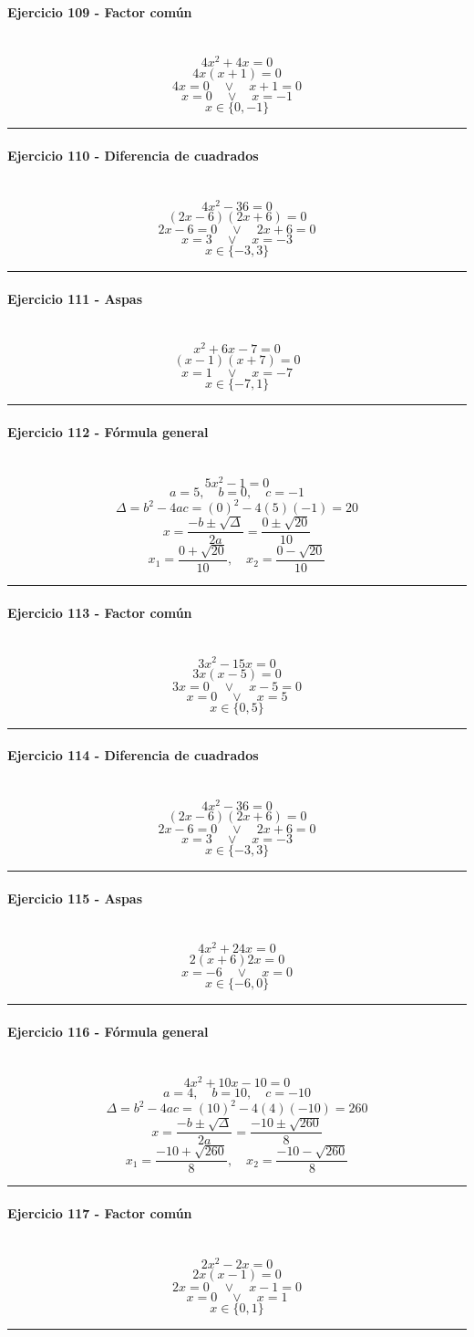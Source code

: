 \documentclass[10pt,a4paper]{article}
\newcommand{\res}[1]{\paragraph{#1}\mbox{}\\[-1.2em]}
\begin{document}
\res{Ejercicio 109 - Factor común}
\[ 4 x^{2} + 4 x=0 \]
\[ 4x(x+1)=0 \]
\[ 4x=0 \quad \vee \quad x+1=0 \]
\[ x=0 \quad \vee \quad x=-1 \]
\[ \boxed{x\in\{0,-1\}} \]
\vspace{1mm}\hrule\vspace{2mm}
\res{Ejercicio 110 - Diferencia de cuadrados}
\[ 4 x^{2} - 36=0 \]
\[ (2x-6)(2x+6)=0 \]
\[ 2x-6=0 \quad \vee \quad 2x+6=0 \]
\[ x=3 \quad \vee \quad x=-3 \]
\[ \boxed{x\in\{-3,3\}} \]
\vspace{1mm}\hrule\vspace{2mm}
\res{Ejercicio 111 - Aspas}
\[ x^{2} + 6 x - 7=0 \]
\[ (x-1)(x+7)=0 \]
\[ x=1 \quad \vee \quad x=-7 \]
\[ \boxed{x\in\{-7,1\}} \]
\vspace{1mm}\hrule\vspace{2mm}
\res{Ejercicio 112 - Fórmula general}
\[ 5 x^{2} - 1=0 \]
\[ a=5,\quad b=0,\quad c=-1 \]
\[ \Delta=b^2-4ac=(0)^2-4(5)(-1)=20 \]
\[ x=\frac{-b\pm\sqrt{\Delta}}{2a}=\frac{0\pm\sqrt{20}}{10} \]
\[ \boxed{x_1=\frac{0+\sqrt{20}}{10},\quad x_2=\frac{0-\sqrt{20}}{10}} \]
\vspace{1mm}\hrule\vspace{2mm}
\res{Ejercicio 113 - Factor común}
\[ 3 x^{2} - 15 x=0 \]
\[ 3x(x-5)=0 \]
\[ 3x=0 \quad \vee \quad x-5=0 \]
\[ x=0 \quad \vee \quad x=5 \]
\[ \boxed{x\in\{0,5\}} \]
\vspace{1mm}\hrule\vspace{2mm}
\res{Ejercicio 114 - Diferencia de cuadrados}
\[ 4 x^{2} - 36=0 \]
\[ (2x-6)(2x+6)=0 \]
\[ 2x-6=0 \quad \vee \quad 2x+6=0 \]
\[ x=3 \quad \vee \quad x=-3 \]
\[ \boxed{x\in\{-3,3\}} \]
\vspace{1mm}\hrule\vspace{2mm}
\res{Ejercicio 115 - Aspas}
\[ 4 x^{2} + 24 x=0 \]
\[ 2(x+6)2x=0 \]
\[ x=-6 \quad \vee \quad x=0 \]
\[ \boxed{x\in\{-6,0\}} \]
\vspace{1mm}\hrule\vspace{2mm}
\res{Ejercicio 116 - Fórmula general}
\[ 4 x^{2} + 10 x - 10=0 \]
\[ a=4,\quad b=10,\quad c=-10 \]
\[ \Delta=b^2-4ac=(10)^2-4(4)(-10)=260 \]
\[ x=\frac{-b\pm\sqrt{\Delta}}{2a}=\frac{-10\pm\sqrt{260}}{8} \]
\[ \boxed{x_1=\frac{-10+\sqrt{260}}{8},\quad x_2=\frac{-10-\sqrt{260}}{8}} \]
\vspace{1mm}\hrule\vspace{2mm}
\res{Ejercicio 117 - Factor común}
\[ 2 x^{2} - 2 x=0 \]
\[ 2x(x-1)=0 \]
\[ 2x=0 \quad \vee \quad x-1=0 \]
\[ x=0 \quad \vee \quad x=1 \]
\[ \boxed{x\in\{0,1\}} \]
\vspace{1mm}\hrule\vspace{2mm}
\end{document}
